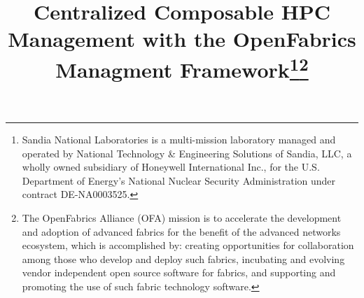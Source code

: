 \documentclass[conference]{IEEEtran}
\begin{document}
\title{Centralized Composable HPC Management with the OpenFabrics Managment Framework\thanks{Sandia National Laboratories is a multi-mission laboratory managed and operated by National Technology \& Engineering Solutions of Sandia, LLC, a wholly owned subsidiary of Honeywell International Inc., for the U.S. Department of Energy’s National Nuclear Security Administration under contract DE-NA0003525.}\thanks{The OpenFabrics Alliance (OFA) mission is to accelerate the development and adoption of advanced fabrics for the benefit of the advanced networks ecosystem, which is accomplished by: creating opportunities for collaboration among those who develop and deploy such fabrics, incubating and evolving vendor independent open source software for fabrics, and supporting and promoting the use of such fabric technology software.}
}

\author{
\and
{}
\and
{}
\and
{}
}

\maketitle
\end{document}
